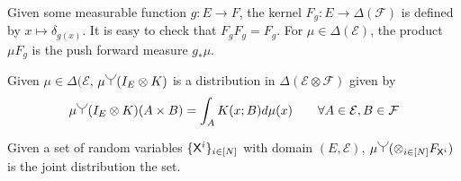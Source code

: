 Given some measurable function $g:E\to F$, the kernel $F_g:E\to \Delta(\mathcal{F})$ is defined by $x\mapsto \delta_{g(x)}$. It is easy to check that $F_g F_g = F_g$. For $\mu\in \Delta(\mathcal{E})$, the product $\mu F_g$ is the push forward measure $g_*\mu$. 

Given $\mu\in \Delta(\mathcal{E}$, $\mu\splitter{0.15}(I_E\otimes K)$ is a distribution in $\Delta(\mathcal{E}\otimes\mathcal{F})$ given by
\begin{align}
    \mu\splitter{0.15}(I_E\otimes K)(A\times B) = \int_A K(x;B) d\mu(x)\qquad \forall A\in \mathcal{E},B\in \mathcal{F}
\end{align}


Given a set of random variables $\{\mathsf{X}^i\}_{i\in[N]}$ with domain $(E,\mathcal{E})$,  $\mu\splitter{0.15}(\otimes_{i\in[N]} F_{\RV{X}^i})$ is the joint distribution the set.


